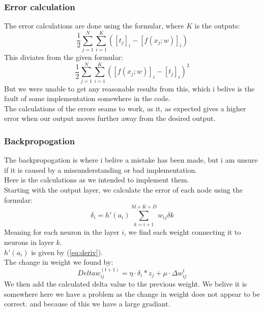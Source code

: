 \documentclass{article}
\begin{document}
\subsubsection{Error calculation}
The error calculations are done using the formular, where $K$ is the outputs:
\begin{equation} \label{eq:badError}
    \frac{1}{2} \sum_{j = 1}^{N}\sum_{i = 1}^{K}([t_j]_i - [f(x_j;w)]_i)
\end{equation}
This diviates from the given formular:
\begin{equation}
    \frac{1}{2} \sum_{j = 1}^{N} \sum_{i = 1}^{K}([f(x_j;w)]_i - [t_j]_i)^2
\end{equation}
But we were unable to get any reasonable results from this, which i belive is the fault of some implementation somewhere in the code.\\
The calculations of the errors seams to work, as it, as expected gives a higher error when our output moves further away from the desired output.\\

\subsubsection{Backpropogation}
The backpropogation is where i belive a mistake has been made, but i am unsure if it is caused by a missunderstanding or bad implementation.\\
Here is the calculations as we intended to implement them.\\
Starting with the output layer, we calculate the error of each node using the formular:
\begin{equation}
    \delta_i = h'(a_i) \sum_{k = i + 1}^{M + K + D}w_{ij} \delta{k}
\end{equation}
Meaning for each neuron in the layer $i$, we find each weight connecting it to neurons in layer $k$.\\
$h'(a_i)$ is given by (\ref{eq:deriv}).\\
The change in weight we found by:
\begin{equation}
    Delta w_{ij}^{(t + 1)} = \eta \cdot \delta_i * z_j + \mu \cdot \Delta w_{ij}^{t}
\end{equation}
We then add the calculated delta value to the previous weight. 
We belive it is somewhere here we have a problem as the change in 
weight does not appear to be correct. and because of this we have a
large gradiant.
\end{document}
